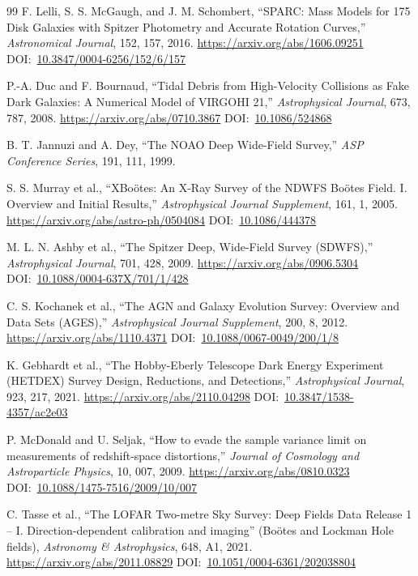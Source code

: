 \documentclass[10pt,onecolumn]{article}
\newcommand{\doi}[1]{DOI:~\href{https://doi.org/#1}{#1}}
\begin{document}
\begin{thebibliography}{99}
F. Lelli, S. S. McGaugh, and J. M. Schombert,
``SPARC: Mass Models for 175 Disk Galaxies with Spitzer Photometry and Accurate Rotation Curves,''
\emph{Astronomical Journal}, 152, 157, 2016.
\url{https://arxiv.org/abs/1606.09251}
\doi{10.3847/0004-6256/152/6/157}

P.-A. Duc and F. Bournaud,
``Tidal Debris from High-Velocity Collisions as Fake Dark Galaxies: A Numerical Model of VIRGOHI 21,''
\emph{Astrophysical Journal}, 673, 787, 2008.
\url{https://arxiv.org/abs/0710.3867}
\doi{10.1086/524868}

B. T. Jannuzi and A. Dey,
``The NOAO Deep Wide-Field Survey,''
\emph{ASP Conference Series}, 191, 111, 1999.

S. S. Murray et al.,
``XBo\"otes: An X-Ray Survey of the NDWFS Bo\"otes Field. I. Overview and Initial Results,''
\emph{Astrophysical Journal Supplement}, 161, 1, 2005.
\url{https://arxiv.org/abs/astro-ph/0504084}
\doi{10.1086/444378}

M. L. N. Ashby et al.,
``The Spitzer Deep, Wide-Field Survey (SDWFS),''
\emph{Astrophysical Journal}, 701, 428, 2009.
\url{https://arxiv.org/abs/0906.5304}
\doi{10.1088/0004-637X/701/1/428}

C. S. Kochanek et al.,
``The AGN and Galaxy Evolution Survey: Overview and Data Sets (AGES),''
\emph{Astrophysical Journal Supplement}, 200, 8, 2012.
\url{https://arxiv.org/abs/1110.4371}
\doi{10.1088/0067-0049/200/1/8}

K. Gebhardt et al.,
``The Hobby-Eberly Telescope Dark Energy Experiment (HETDEX) Survey Design, Reductions, and Detections,''
\emph{Astrophysical Journal}, 923, 217, 2021.
\url{https://arxiv.org/abs/2110.04298}
\doi{10.3847/1538-4357/ac2e03}

P. McDonald and U. Seljak,
``How to evade the sample variance limit on measurements of redshift-space distortions,''
\emph{Journal of Cosmology and Astroparticle Physics}, 10, 007, 2009.
\url{https://arxiv.org/abs/0810.0323}
\doi{10.1088/1475-7516/2009/10/007}

C. Tasse et al.,
``The LOFAR Two-metre Sky Survey: Deep Fields Data Release 1 -- I. Direction-dependent calibration and imaging'' (Bo\"otes and Lockman Hole fields),
\emph{Astronomy \& Astrophysics}, 648, A1, 2021.
\url{https://arxiv.org/abs/2011.08829}
\doi{10.1051/0004-6361/202038804}


\end{thebibliography}
\end{document}
